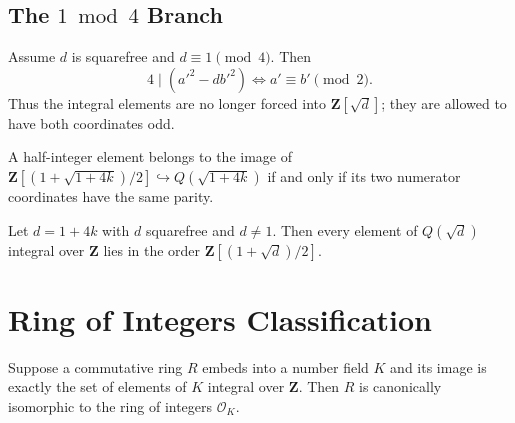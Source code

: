 \section{The \texorpdfstring{$1 \bmod 4$}{1 mod 4} Branch}

\begin{lemma}%
\label{lem:mod4-one}
\leanok
Assume $d$ is squarefree and $d \equiv 1 \pmod 4$. Then
\[
  4 \mid (a'^2 - d b'^2)
  \iff
  a' \equiv b' \pmod 2.
\]
Thus the integral elements are no longer forced into $\mathbf{Z}[\sqrt d]$; they
are allowed to have both coordinates odd.
\end{lemma}

\begin{lemma}%
\label{lem:zomega-carrier}
\leanok
A half-integer element belongs to the image of
$\mathbf{Z}[(1+\sqrt{1+4k})/2] \hookrightarrow Q(\sqrt{1+4k})$ if and only if its
two numerator coordinates have the same parity.
\end{lemma}

\begin{theorem}%
\label{thm:integral-in-zomega}%
\leanok
{}
Let $d = 1 + 4k$ with $d$ squarefree and $d \neq 1$. Then every element of
$Q(\sqrt d)$ integral over\/ $\mathbf{Z}$ lies in the order
$\mathbf{Z}[(1+\sqrt d)/2]$.
\end{theorem}

\chapter{Ring of Integers Classification}

\begin{theorem}%
\label{thm:ring-of-integers-embedding}%
\leanok
Suppose a commutative ring $R$ embeds into a number field $K$ and its image is
exactly the set of elements of $K$ integral over\/ $\mathbf{Z}$. Then $R$ is
canonically isomorphic to the ring of integers $\mathcal{O}_K$.
\end{theorem}

